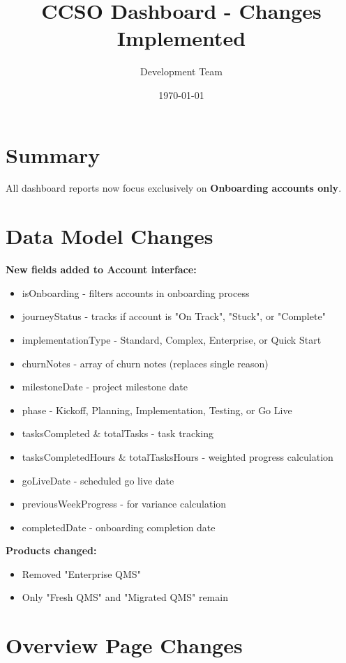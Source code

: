 \documentclass[12pt,a4paper]{article}
\title{\textbf{CCSO Dashboard - Changes Implemented}}
\author{Development Team}
\date{\today}
\begin{document}
\maketitle

\section*{Summary}

All dashboard reports now focus exclusively on \textbf{Onboarding accounts only}.

\section*{Data Model Changes}

\textbf{New fields added to Account interface:}
\begin{itemize}[leftmargin=*]
    \item isOnboarding - filters accounts in onboarding process
    \item journeyStatus - tracks if account is "On Track", "Stuck", or "Complete"
    \item implementationType - Standard, Complex, Enterprise, or Quick Start
    \item churnNotes - array of churn notes (replaces single reason)
    \item milestoneDate - project milestone date
    \item phase - Kickoff, Planning, Implementation, Testing, or Go Live
    \item tasksCompleted \& totalTasks - task tracking
    \item tasksCompletedHours \& totalTasksHours - weighted progress calculation
    \item goLiveDate - scheduled go live date
    \item previousWeekProgress - for variance calculation
    \item completedDate - onboarding completion date
\end{itemize}

\textbf{Products changed:}
\begin{itemize}[leftmargin=*]
    \item Removed "Enterprise QMS"
    \item Only "Fresh QMS" and "Migrated QMS" remain
\end{itemize}

\section*{Overview Page Changes}
\end{document}
